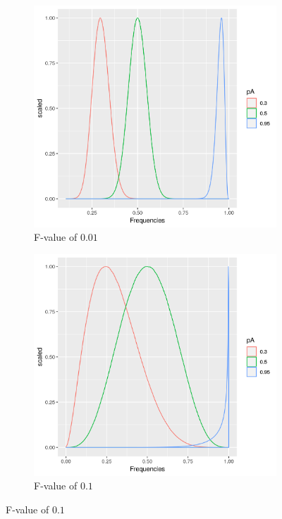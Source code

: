 \documentclass[a4paper, 11pt]{article}
\begin{document}
\begin{figure}
\centering
\begin{subfigure}
\centering
\caption{F-value of $0.01$}
\includegraphics[scale=0.5]{rbeta_plot_001}
\end{subfigure}
\begin{subfigure}
\centering
\caption{F-value of $0.1$}
\includegraphics[scale=0.5]{rbeta_plot_01}

\end{subfigure}
\end{figure}
\end{document}

